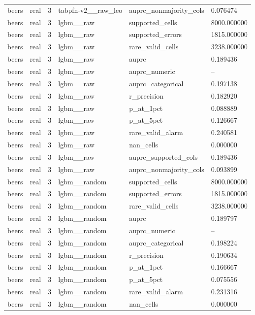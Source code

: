 \begin{tabular}{llllll}
beers & real & 3 & tabpfn-v2\_\_raw\_leo & auprc\_nonmajority\_cols & 0.076474 \\
beers & real & 3 & lgbm\_\_raw & supported\_cells & 8000.000000 \\
beers & real & 3 & lgbm\_\_raw & supported\_errors & 1815.000000 \\
beers & real & 3 & lgbm\_\_raw & rare\_valid\_cells & 3238.000000 \\
beers & real & 3 & lgbm\_\_raw & auprc & 0.189436 \\
beers & real & 3 & lgbm\_\_raw & auprc\_numeric & -- \\
beers & real & 3 & lgbm\_\_raw & auprc\_categorical & 0.197138 \\
beers & real & 3 & lgbm\_\_raw & r\_precision & 0.182920 \\
beers & real & 3 & lgbm\_\_raw & p\_at\_1pct & 0.088889 \\
beers & real & 3 & lgbm\_\_raw & p\_at\_5pct & 0.126667 \\
beers & real & 3 & lgbm\_\_raw & rare\_valid\_alarm & 0.240581 \\
beers & real & 3 & lgbm\_\_raw & nan\_cells & 0.000000 \\
beers & real & 3 & lgbm\_\_raw & auprc\_supported\_cols & 0.189436 \\
beers & real & 3 & lgbm\_\_raw & auprc\_nonmajority\_cols & 0.093899 \\
beers & real & 3 & lgbm\_\_random & supported\_cells & 8000.000000 \\
beers & real & 3 & lgbm\_\_random & supported\_errors & 1815.000000 \\
beers & real & 3 & lgbm\_\_random & rare\_valid\_cells & 3238.000000 \\
beers & real & 3 & lgbm\_\_random & auprc & 0.189797 \\
beers & real & 3 & lgbm\_\_random & auprc\_numeric & -- \\
beers & real & 3 & lgbm\_\_random & auprc\_categorical & 0.198224 \\
beers & real & 3 & lgbm\_\_random & r\_precision & 0.190634 \\
beers & real & 3 & lgbm\_\_random & p\_at\_1pct & 0.166667 \\
beers & real & 3 & lgbm\_\_random & p\_at\_5pct & 0.075556 \\
beers & real & 3 & lgbm\_\_random & rare\_valid\_alarm & 0.231316 \\
beers & real & 3 & lgbm\_\_random & nan\_cells & 0.000000 \\

\end{tabular}
